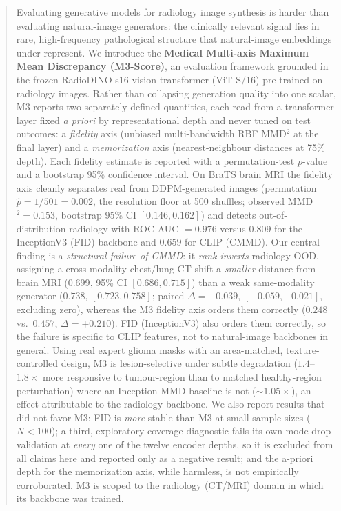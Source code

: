 \documentclass[lettersize,journal]{IEEEtran}
\begin{document}
\begin{abstract}
Evaluating generative models for radiology image synthesis is harder than evaluating natural-image generators: the clinically relevant signal lies in rare, high-frequency pathological structure that natural-image embeddings under-represent. We introduce the \textbf{Medical Multi-axis Maximum Mean Discrepancy (M3-Score)}, an evaluation framework grounded in the frozen RadioDINO-s16 vision transformer (ViT-S/16) pre-trained on radiology images. Rather than collapsing generation quality into one scalar, M3 reports two separately defined quantities, each read from a transformer layer fixed \emph{a priori} by representational depth and never tuned on test outcomes: a \emph{fidelity} axis (unbiased multi-bandwidth RBF MMD\(^2\) at the final layer) and a \emph{memorization} axis (nearest-neighbour distances at 75\% depth). Each fidelity estimate is reported with a permutation-test $p$-value and a bootstrap 95\% confidence interval. On BraTS brain MRI the fidelity axis cleanly separates real from DDPM-generated images (permutation $\hat{p} = 1/501 = 0.002$, the resolution floor at 500 shuffles; observed MMD$^2 = 0.153$, bootstrap 95\% CI $[0.146, 0.162]$) and detects out-of-distribution radiology with ROC-AUC $= 0.976$ versus $0.809$ for the InceptionV3 (FID) backbone and $0.659$ for CLIP (CMMD). Our central finding is a \emph{structural failure of CMMD}: it \emph{rank-inverts} radiology OOD, assigning a cross-modality chest/lung CT shift a \emph{smaller} distance from brain MRI ($0.699$, 95\% CI $[0.686,0.715]$) than a weak same-modality generator ($0.738$, $[0.723,0.758]$; paired $\Delta = -0.039$, $[-0.059,-0.021]$, excluding zero), whereas the M3 fidelity axis orders them correctly ($0.248$ vs.\ $0.457$, $\Delta = +0.210$). FID (InceptionV3) also orders them correctly, so the failure is specific to CLIP features, not to natural-image backbones in general. Using real expert glioma masks with an area-matched, texture-controlled design, M3 is lesion-selective under subtle degradation ($1.4$--$1.8\times$ more responsive to tumour-region than to matched healthy-region perturbation) where an Inception-MMD baseline is not ($\sim$$1.05\times$), an effect attributable to the radiology backbone. We also report results that did not favor M3: FID is \emph{more} stable than M3 at small sample sizes ($N < 100$); a third, exploratory coverage diagnostic fails its own mode-drop validation at \emph{every} one of the twelve encoder depths, so it is excluded from all claims here and reported only as a negative result; and the a-priori depth for the memorization axis, while harmless, is not empirically corroborated. M3 is scoped to the radiology (CT/MRI) domain in which its backbone was trained.
\end{abstract}
\end{document}
